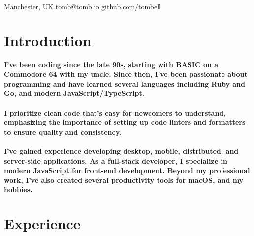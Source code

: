 \maketitle

\begin{center}
  \raisebox{0\height}{\small\faMapMarker} Manchester, UK
  \hspace{1 cm}
  \raisebox{-0.1\height}{\small\faEnvelope} tomb@tomb.io
  \hspace{1 cm}
  \raisebox{-0.1\height}{\small\faGithubAlt} github.com/tombell
\end{center}

\section{Introduction}
\paragraph{I've been coding since the late 90s, starting with BASIC on a
Commodore 64 with my uncle. Since then, I've been passionate about programming
and have learned several languages including Ruby and Go, and modern
JavaScript/TypeScript.}

\paragraph{I prioritize clean code that's easy for newcomers to understand,
emphasizing the importance of setting up code linters and formatters to ensure
quality and consistency.}

\paragraph{I've gained experience developing desktop, mobile, distributed, and
server-side applications. As a full-stack developer, I specialize in modern
JavaScript for front-end development. Beyond my professional work, I've also
created several productivity tools for macOS, and my hobbies.}

\section{Experience}

